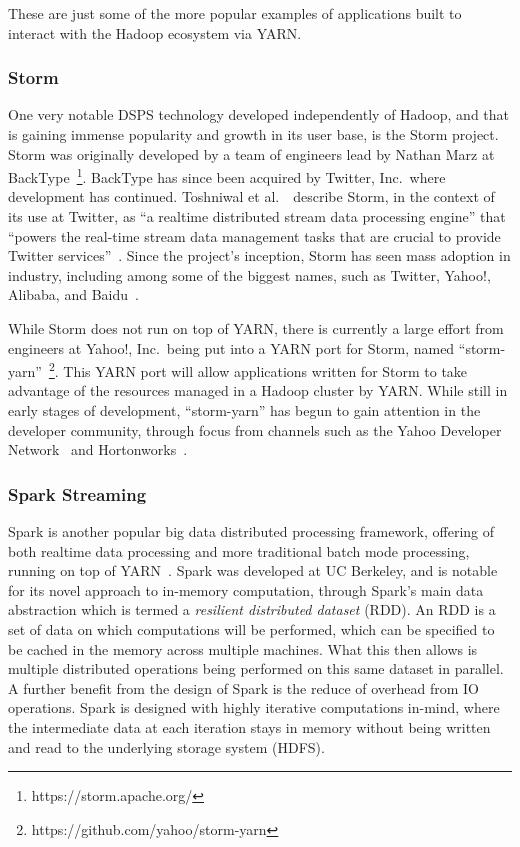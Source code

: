\documentclass[a4paper,11pt]{article}
\begin{document}
These are just some of the more popular examples of applications built to interact with the Hadoop ecosystem via YARN.



\subsubsection{Storm} %
\label{ssub:storm}

One very notable DSPS technology developed independently of Hadoop, and that is gaining immense popularity and growth in its
user base, is the Storm project. Storm was originally developed by a team of engineers lead by Nathan Marz at
BackType~\footnote{https://storm.apache.org/}. BackType has since been acquired by Twitter, Inc.\ where development has
continued. Toshniwal et al.~\cite{toshniwal2014storm}\ describe Storm, in the context of its use at Twitter, as ``a
realtime distributed stream data processing engine'' that ``powers the real-time stream data management tasks that are
crucial to provide Twitter services''~\cite[p.\ 147]{toshniwal2014storm}. Since the project's inception, Storm has seen mass
adoption in industry, including among some of the biggest names, such as Twitter, Yahoo!, Alibaba, and
Baidu~\cite{storm_users}.

While Storm does not run on top of YARN, there is currently a large effort from engineers at Yahoo!, Inc.\ being put
into a YARN port for Storm, named ``storm-yarn''~\footnote{https://github.com/yahoo/storm-yarn}. This YARN port will
allow applications written for Storm to take advantage of the resources managed in a Hadoop cluster by YARN. While still
in early stages of development, ``storm-yarn'' has begun to gain attention in the developer community, through focus from
channels such as the Yahoo Developer Network~\cite{web_yahoo_blog} and Hortonworks~\cite{web_hortonworks_blog}.



\subsubsection{Spark Streaming} %
\label{ssub:spark_streaming}

Spark is another popular big data distributed processing framework, offering of both realtime data processing
and more traditional batch mode processing, running on top of YARN~\cite{zaharia2010spark}. Spark was developed at UC
Berkeley, and is notable for its novel approach to in-memory computation, through Spark's main data abstraction which is
termed a \emph{resilient distributed dataset} (RDD). An RDD is a set of data on which computations will be performed,
which can be specified to be cached in the memory across multiple machines. What this then allows is multiple distributed
operations being performed on this same dataset in parallel. A further benefit from the design of Spark is the reduce of
overhead from IO operations. Spark is designed with highly iterative computations in-mind, where the intermediate data
at each iteration stays in memory without being written and read to the underlying storage system (\eg{}HDFS).
\end{document}
